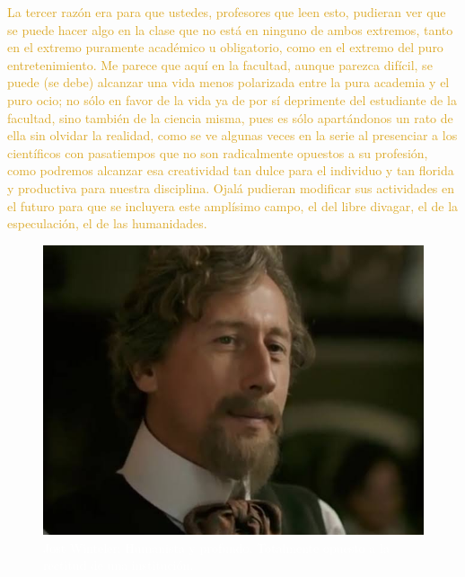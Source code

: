 \documentclass{article}
\begin{document}
\textcolor{Goldenrod}{La tercer razón era para que ustedes, profesores que leen esto, pudieran ver que se puede hacer algo en la clase que no está en ninguno de ambos extremos, tanto en el extremo puramente académico u obligatorio, como en el extremo del puro entretenimiento. Me parece que aquí en la facultad, aunque parezca difícil, se puede (se debe) alcanzar una vida menos polarizada entre la pura academia y el puro ocio; no sólo en favor de la vida ya de por sí deprimente del estudiante de la facultad, sino también de la ciencia misma, pues es sólo apartándonos un rato de ella sin olvidar la realidad, como se ve algunas veces en la serie al presenciar a los científicos con pasatiempos que no son radicalmente opuestos a su profesión, como podremos alcanzar esa creatividad tan dulce para el individuo y tan florida y productiva para nuestra disciplina. Ojalá pudieran modificar sus actividades en el futuro para que se incluyera este amplísimo campo, el del libre divagar, el de la especulación, el de las humanidades.}\\
\vspace{10cm}


\vspace{1cm}

\begin{figure}

\includegraphics[scale=0.12, angle=-18]{Jost_Winteler.jpeg}
\caption{\textcolor{White}{Jost Winteler: Humanista y profundo. Totalmente opuesto a la rectitud de una institución.}}

\end{figure}
\end{document}
